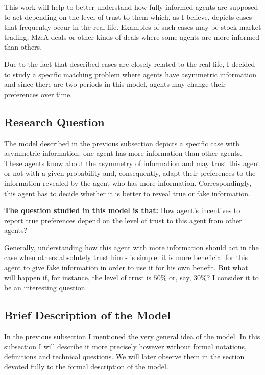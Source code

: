 \documentclass[a4paper]{article} %
\begin{document}
\hfill 
\break
This work will help to better understand how fully informed agents are supposed to act depending on the level of trust to them which, as I believe, depicts cases that frequently occur in the real life. Examples of such cases may be stock market trading, M\&A deals or other kinds of deals where some agents are more informed than others.

\hfill 
\break
Due to the fact that described cases are closely related to the real life, I decided to study a specific matching problem where agents have asymmetric information and since there are two periods in this model, agents may change their preferences over time.






\subsection{Research Question}

\hfill 
\break
The model described in the previous subsection depicts a specific case with asymmetric information: one agent has more information than other agents. These agents know about the asymmetry of information and may trust this agent or not with a given probability and, consequently, adapt their preferences to the information revealed by the agent who has more information. Correspondingly, this agent has to decide whether it is better to reveal true or fake information.

\hfill 
\break
\textbf{The question studied in this model is that:}
How agent's incentives to report true preferences depend on the level of trust to this agent from other agents?

\hfill 
\break
Generally, understanding how this agent with more information should act in the case when others absolutely trust him - is simple: it is more beneficial for this agent to give fake information in order to use it for his own benefit. But what will happen if, for instance, the level of trust is $50\%$ or, say, $30\%$? I consider it to be an interesting question.





\subsection{Brief Description of the Model}
In the previous subsection I mentioned the very general idea of the model. In this subsection I will describe it more precisely however without formal notations, definitions and technical questions. We will later observe them in the section devoted fully to the formal description of the model.
\end{document}
